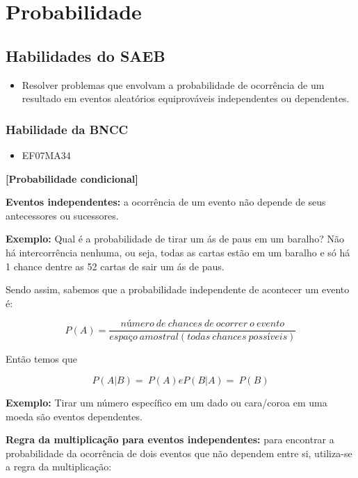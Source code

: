 \chapter{Probabilidade}

\section{Habilidades do SAEB }
\begin{itemize}
\item Resolver problemas que envolvam a probabilidade de
ocorrência de um resultado em eventos aleatórios equiprováveis
independentes ou dependentes.
\end{itemize}

\subsection{Habilidade da BNCC}
\begin{itemize}
  \item EF07MA34
  \end{itemize}


\textbf{{[}Probabilidade condicional{]}}

\textbf{Eventos independentes:} a ocorrência de um evento não depende de
seus antecessores ou sucessores.

\textbf{Exemplo:} Qual é a probabilidade de tirar um ás de paus em um
baralho? Não há intercorrência nenhuma, ou seja, todas as cartas estão
em um baralho e só há 1 chance dentre as 52 cartas de sair um ás de
paus.

Sendo assim, sabemos que a probabilidade independente de acontecer um
evento é:

$$P(A)= \frac{número \ de \ chances \ de \ ocorrer \ o  \ evento}{espaço \ amostral (todas \ chances \ possíveis)}$$

Então temos que

$$P(A|B) = \ P(A) e P(B|A) = \ P(B)$$

\textbf{Exemplo:} Tirar um número específico em um dado ou cara/coroa em
uma moeda são eventos dependentes.

\textbf{Regra da multiplicação para eventos independentes:} para
encontrar a probabilidade da ocorrência de dois eventos que não dependem
entre si, utiliza-se a regra da multiplicação:

